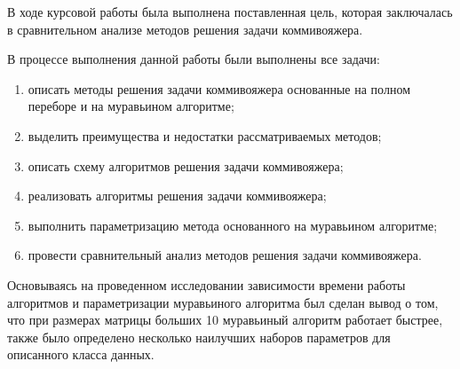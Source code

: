 
В ходе курсовой работы была выполнена поставленная цель, которая заключалась в сравнительном анализе методов решения задачи коммивояжера.

В процессе выполнения данной работы были выполнены все задачи:
\begin{enumerate}
	\item описать методы решения задачи коммивояжера основанные на полном переборе и на муравьином алгоритме;
	\item выделить преимущества и недостатки рассматриваемых методов;
	\item описать схему алгоритмов решения задачи коммивояжера;
	\item реализовать алгоритмы решения задачи коммивояжера;
	\item выполнить параметризацию метода основанного на муравьином алгоритме;
	\item провести сравнительный анализ методов решения задачи коммивояжера.
\end{enumerate}

Основываясь на проведенном исследовании зависимости времени работы алгоритмов и параметризации муравьиного алгоритма был сделан вывод о том, что при размерах матрицы больших 10 муравьиный алгоритм работает быстрее, также было определено несколько наилучших наборов параметров для описанного класса данных.